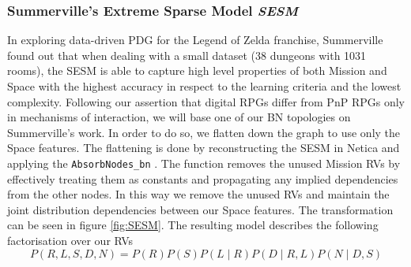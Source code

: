 \documentclass{UoYCSproject}
\begin{document}
\subsubsection{Summerville's Extreme Sparse Model \textit{SESM}}
In exploring data-driven PDG for the Legend of Zelda franchise, Summerville found out that when dealing with a small dataset (38 dungeons with 1031 rooms), the SESM is able to capture high level properties of both Mission and Space with the highest accuracy in respect to the learning criteria and the lowest complexity. Following our assertion that digital RPGs differ from PnP RPGs only in mechanisms of interaction, we will base one of our BN topologies on Summerville's work. In order to do so, we flatten down the graph to use only the Space features. The flattening is done by reconstructing the SESM in Netica and applying the \texttt{AbsorbNodes\_bn} \parencite[62-63]{neticaCman}. The function removes the unused Mission RVs by effectively treating them as constants and propagating any implied dependencies from the other nodes. In this way we remove the unused RVs and maintain the joint distribution dependencies between our Space features. The transformation can be seen in figure \ref{fig:SESM}. The resulting model describes the following factorisation over our RVs
\begin{equation}
  \label{eq:SESM}
  P(R,L,S,D,N) = P(R)P(S)P(L \mid R)P(D \mid R, L)P(N \mid D, S)
\end{equation}
\end{document}
